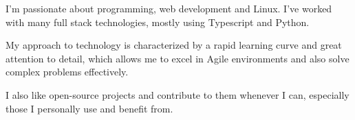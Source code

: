 

\begin{cvparagraph}

I'm passionate about programming, web development
and Linux.
I've worked with many full stack technologies, mostly using
Typescript and Python.
\end{cvparagraph}

\begin{cvparagraph}
My approach to technology is characterized by a rapid learning curve and great attention to detail, which allows me to excel in Agile environments and also solve complex problems effectively.
\end{cvparagraph}

\begin{cvparagraph}

I also like open-source projects and contribute to them whenever I can, especially those I personally use and benefit from.


\end{cvparagraph}